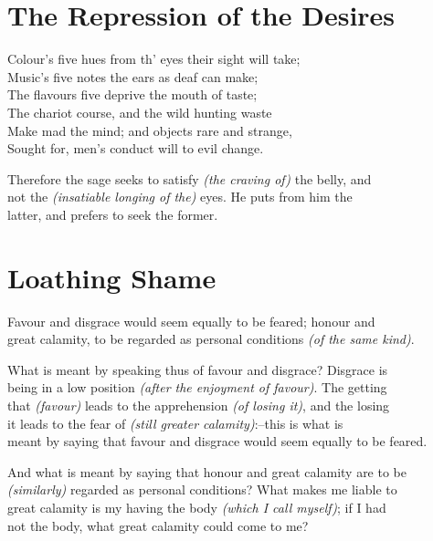 \section*{The Repression of the Desires}
    Colour's five hues from th' eyes their sight will take;\\
    Music's five notes the ears as deaf can make;\\
    The flavours five deprive the mouth of taste;\\
    The chariot course, and the wild hunting waste\\
    Make mad the mind; and objects rare and strange,\\
    Sought for, men's conduct will to evil change.\vspace{\baselineskip}
    
    Therefore the sage seeks to satisfy \textit{(the craving of)} the belly, and\\
    not the \textit{(insatiable longing of the)} eyes. He puts from him the\\
    latter, and prefers to seek the former.\vspace{\baselineskip}
    
\section*{Loathing Shame}
    Favour and disgrace would seem equally to be feared; honour and\\
    great calamity, to be regarded as personal conditions \textit{(of the same
    kind)}.\vspace{\baselineskip}
    
    What is meant by speaking thus of favour and disgrace? Disgrace is\\
    being in a low position \textit{(after the enjoyment of favour)}. The getting\\
    that \textit{(favour)} leads to the apprehension \textit{(of losing it)}, and the losing\\
    it leads to the fear of \textit{(still greater calamity)}:--this is what is\\
    meant by saying that favour and disgrace would seem equally to be feared.\vspace{\baselineskip}
    
    And what is meant by saying that honour and great calamity are to be\\
    \textit{(similarly)} regarded as personal conditions? What makes me liable to\\
    great calamity is my having the body \textit{(which I call myself)}; if I had\\
    not the body, what great calamity could come to me?\vspace{\baselineskip}
    
